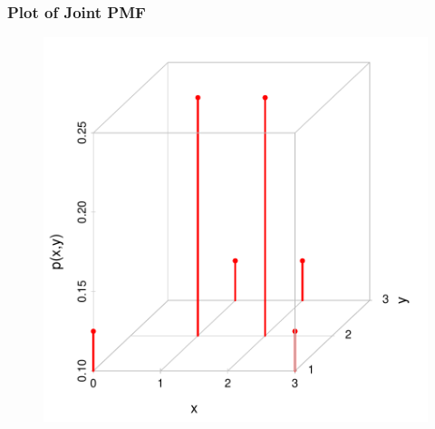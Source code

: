 \documentclass[handout]{beamer}
\begin{document}
\begin{frame}
\frametitle{Plot of Joint PMF}
\begin{figure}
	\includegraphics[scale = 0.53]{./images/joint_dist}
\end{figure}

\end{frame}
\end{document}
